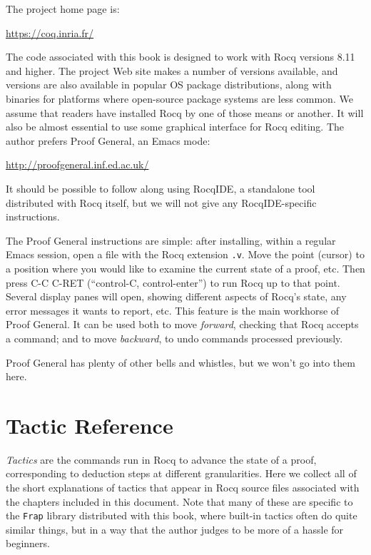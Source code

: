 \documentclass{amsbook}
\theoremstyle{definition}
\theoremstyle{remark}
\numberwithin{section}{chapter}
\numberwithin{equation}{chapter}
\begin{document}
The project home page is:
\begin{center}
  \url{https://coq.inria.fr/}
\end{center}
The code associated with this book is designed to work with Rocq versions 8.11 and higher.
The project Web site makes a number of versions available, and versions are also available in popular OS package distributions, along with binaries for platforms where open-source package systems are less common.
We assume that readers have installed Rocq by one of those means or another.
It will also be almost essential to use some graphical interface for Rocq editing.
The author prefers Proof General, an Emacs mode:
\begin{center}
  \url{http://proofgeneral.inf.ed.ac.uk/}
\end{center}
It should be possible to follow along using RocqIDE, a standalone tool distributed with Rocq itself, but we will not give any RocqIDE-specific instructions.

The Proof General instructions are simple: after installing, within a regular Emacs session, open a file with the Rocq extension \texttt{.v}.
Move the point (cursor) to a position where you would like to examine the current state of a proof, etc.
Then press C-C C-RET (``control-C, control-enter'') to run Rocq up to that point.
Several display panes will open, showing different aspects of Rocq's state, any error messages it wants to report, etc.
This feature is the main workhorse of Proof General.
It can be used both to move \emph{forward}, checking that Rocq accepts a command; and to move \emph{backward}, to undo commands processed previously.

Proof General has plenty of other bells and whistles, but we won't go into them here.

\section{Tactic Reference}

\emph{Tactics} are the commands run in Rocq to advance the state of a proof, corresponding to deduction steps at different granularities.
Here we collect all of the short explanations of tactics that appear in Rocq source files associated with the chapters included in this document.
Note that many of these are specific to the \texttt{Frap} library distributed with this book, where built-in tactics often do quite similar things, but in a way that the author judges to be more of a hassle for beginners.
\end{document}
